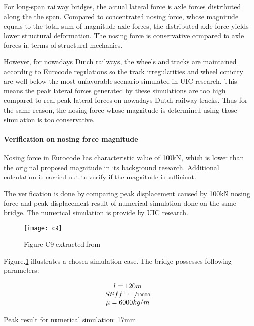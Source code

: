 For long-span railway bridges, the actual lateral force is axle forces distributed along the the span. Compared to concentrated nosing force, whose magnitude equals to the total sum of magnitude axle forces, the distributed axle force yields lower structural deformation. The nosing force is conservative compared to axle forces in terms of structural mechanics.

However, for nowadays Dutch railways, the wheels and tracks are maintained according to Eurocode regulations so the track irregularities and wheel conicity are well below the most unfavorable scenario simulated in UIC research. This means the peak lateral forces generated by these simulations are too high compared to real peak lateral forces on nowadays Dutch railway tracks. Thus for the same reason, the nosing force whose magnitude is determined using those simulation is too conservative.

\paragraph{Verification on nosing force magnitude}

Nosing force in Eurocode has characteristic value of 100kN, which is lower than the original proposed magnitude in its background research. Additional calculation is carried out to verify if the magnitude is sufficient.

The verification is done by comparing peak displacement caused by 100kN nosing force and peak displacement result of numerical simulation done on the same bridge. The numerical simulation is provide by UIC research\citep{d181dt329}.

\begin{figure}[h!]
    \centering
    \texttt{[image: c9]}
    \caption{Figure C9 extracted from \citet{d181dt329} }
    \label{fig:c9}
\end{figure}

Figure.\ref{fig:c9} illustrates a chosen simulation case. The bridge possesses following parameters:

$$
\begin{array}{c}
l = 120m \\ 
Stiff\footnotemark: \sfrac{1}{10000} \\ 
\mu = 6000kg/m\\
\end{array}
$$

Peak result for numerical simulation: 17mm

